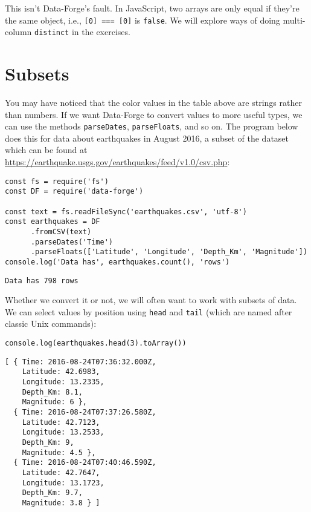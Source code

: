 This isn't Data-Forge's fault.
In JavaScript,
two arrays are only equal if they're the same object,
i.e., \texttt{[0] === [0]} is \texttt{false}.
We will explore ways of doing multi-column \texttt{distinct} in the exercises.

\section{Subsets}\label{s:dataforge-subset}

You may have noticed that the color values in the table above are strings rather than numbers.
If we want Data-Forge to convert values to more useful types,
we can use the methods \texttt{parseDates}, \texttt{parseFloats}, and so on.
The program below does this for data about earthquakes in August 2016,
a subset of the dataset which can be found at \url{https://earthquake.usgs.gov/earthquakes/feed/v1.0/csv.php}:

\begin{verbatim}
const fs = require('fs')
const DF = require('data-forge')

const text = fs.readFileSync('earthquakes.csv', 'utf-8')
const earthquakes = DF
      .fromCSV(text)
      .parseDates('Time')
      .parseFloats(['Latitude', 'Longitude', 'Depth_Km', 'Magnitude'])
console.log('Data has', earthquakes.count(), 'rows')
\end{verbatim}

\begin{verbatim}
Data has 798 rows
\end{verbatim}

Whether we convert it or not,
we will often want to work with subsets of data.
We can select values by position using \texttt{head} and \texttt{tail}
(which are named after classic Unix commands):

\begin{verbatim}
console.log(earthquakes.head(3).toArray())
\end{verbatim}

\begin{verbatim}
[ { Time: 2016-08-24T07:36:32.000Z,
    Latitude: 42.6983,
    Longitude: 13.2335,
    Depth_Km: 8.1,
    Magnitude: 6 },
  { Time: 2016-08-24T07:37:26.580Z,
    Latitude: 42.7123,
    Longitude: 13.2533,
    Depth_Km: 9,
    Magnitude: 4.5 },
  { Time: 2016-08-24T07:40:46.590Z,
    Latitude: 42.7647,
    Longitude: 13.1723,
    Depth_Km: 9.7,
    Magnitude: 3.8 } ]
\end{verbatim}

